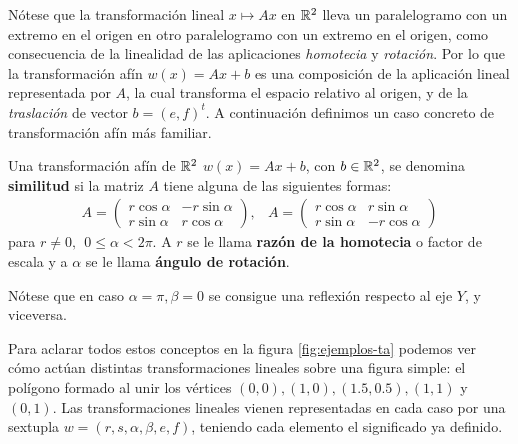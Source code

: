 Nótese que la transformación lineal $x\mapsto Ax$ en $\mathbb{R}^2$ lleva un paralelogramo con un extremo en el origen en otro paralelogramo con un extremo en el origen, como consecuencia de la linealidad de las aplicaciones \textit{homotecia} y \textit{rotación}. Por lo que la transformación afín $w(x)=Ax+b$ es una composición de la aplicación lineal representada por $A$, la cual transforma el espacio relativo al origen, y de la \textit{traslación} de vector $b=(e,f)^t$. A continuación definimos un caso concreto de transformación afín más familiar.

\begin{definicion}
    Una transformación afín de $\mathbb{R}^2$ $w(x)=Ax+b$, con $b\in\mathbb{R}^2$, se denomina \textbf{similitud} si la matriz $A$ tiene alguna de las siguientes formas:
    \begin{eqnarray}
        A = \begin{pmatrix}
            r\cos\alpha & -r\sin\alpha \\
            r\sin\alpha & r\cos\alpha
        \end{pmatrix}
        , &
        A = \begin{pmatrix}
            r\cos\alpha & r\sin\alpha \\
            r\sin\alpha & -r\cos\alpha
        \end{pmatrix}
    \end{eqnarray}
    para $r\not= 0,\ \ 0\leq\alpha<2\pi$. A $r$ se le llama \textbf{razón de la homotecia} o factor de escala y a $\alpha$ se le llama \textbf{ángulo de rotación}.
\end{definicion}

Nótese que en caso $\alpha=\pi,\beta=0$ se consigue una reflexión respecto al eje $Y$, y viceversa.

Para aclarar todos estos conceptos en la figura \ref{fig:ejemplos-ta} podemos ver cómo actúan distintas transformaciones lineales sobre una figura simple: el polígono formado al unir los vértices $(0,0), (1,0), (1.5, 0.5), (1,1)$ y $(0,1)$. Las transformaciones lineales vienen representadas en cada caso por una sextupla $w=(r,s,\alpha,\beta,e,f)$, teniendo cada elemento el significado ya definido.

